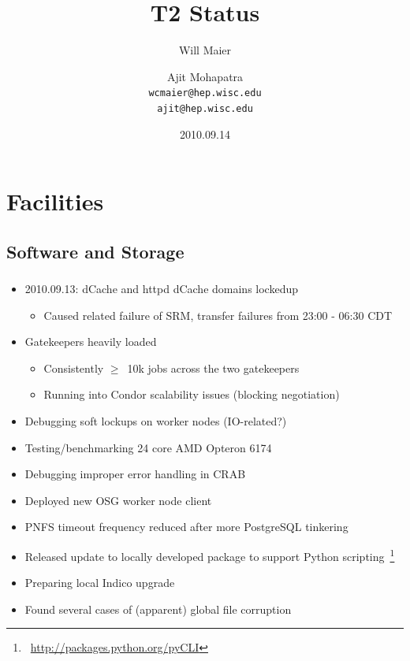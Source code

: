 \documentclass{beamer}
\title{T2 Status}
\author[Maier, Mohapatra]{
    Will Maier \and Ajit Mohapatra\\
    {\tt wcmaier@hep.wisc.edu}\\
    {\tt ajit@hep.wisc.edu}}
\institute[Wisconsin]{University of Wisconsin - High Energy Physics}
\date{2010.09.14}
\begin{document}
\begin{frame}
    \titlepage
\end{frame}


\section{Facilities}
\subsection{Software and Storage}
\begin{frame}
\frametitle{}

\begin{itemize}
	\item 2010.09.13: dCache and httpd dCache domains lockedup
	\begin{itemize}
		\item Caused related failure of SRM, transfer failures from 23:00 - 06:30 CDT
	\end{itemize}
	\item Gatekeepers heavily loaded
	\begin{itemize}
		\item Consistently $\ge$~10k jobs across the two gatekeepers
		\item Running into Condor scalability issues (blocking negotiation)
	\end{itemize}
	\item Debugging soft lockups on worker nodes (IO-related?)
	\item Testing/benchmarking 24 core AMD Opteron 6174
	\item Debugging improper error handling in CRAB
	\item Deployed new OSG worker node client
	\item PNFS timeout frequency reduced after more PostgreSQL tinkering
	\item Released update to locally developed package to support Python scripting~\footnote{~\url{http://packages.python.org/pyCLI}}
	\item Preparing local Indico upgrade
	\item Found several cases of (apparent) global file corruption
\end{itemize}
\end{frame}
\end{document}
